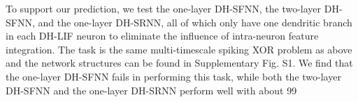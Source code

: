 To support our prediction, we test the one-layer DH-SFNN, the two-layer DH-SFNN, and the one-layer DH-SRNN, all of which only have one dendritic branch in each DH-LIF neuron to eliminate the influence of intra-neuron feature integration. The task is the same multi-timescale spiking XOR problem as above and the network structures can be found in Supplementary Fig. S1. We find that the one-layer DH-SFNN fails in performing this task, while both the two-layer DH-SFNN and the one-layer DH-SRNN perform well with about 99%

